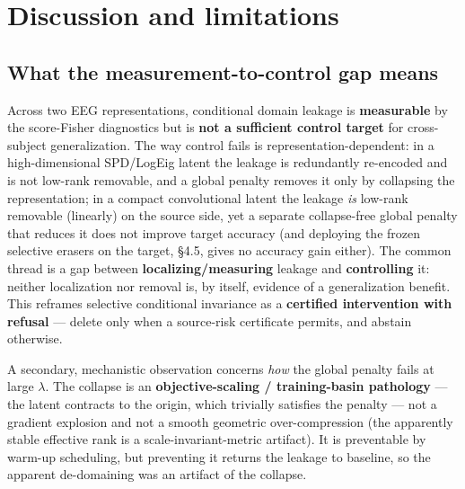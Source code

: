 \section{Discussion and limitations}

\subsection{What the measurement-to-control gap means}
Across two EEG representations, conditional domain leakage is \textbf{measurable} by the score-Fisher
diagnostics but is \textbf{not a sufficient control target} for cross-subject generalization. The way control
fails is representation-dependent: in a high-dimensional SPD/LogEig latent the leakage is redundantly
re-encoded and is not low-rank removable, and a global penalty removes it only by collapsing the
representation; in a compact convolutional latent the leakage \emph{is} low-rank removable (linearly) on the
source side, yet a separate collapse-free global penalty that reduces it does not improve target accuracy
(and deploying the frozen selective erasers on the target, \S4.5, gives no accuracy gain either). The common thread is a gap between \textbf{localizing/measuring}
leakage and \textbf{controlling} it: neither localization nor removal is, by itself, evidence of a
generalization benefit. This reframes selective conditional invariance as a \textbf{certified intervention with
refusal} --- delete only when a source-risk certificate permits, and abstain otherwise.

A secondary, mechanistic observation concerns \emph{how} the global penalty fails at large $\lambda$. The collapse is an
\textbf{objective-scaling / training-basin pathology} --- the latent contracts to the origin, which trivially
satisfies the penalty --- not a gradient explosion and not a smooth geometric over-compression (the apparently
stable effective rank is a scale-invariant-metric artifact). It is preventable by warm-up scheduling, but
preventing it returns the leakage to baseline, so the apparent de-domaining was an artifact of the collapse.

